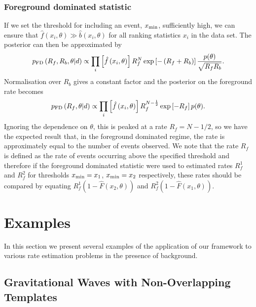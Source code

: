 \documentclass[aps,prd]{revtex4-1}
\begin{document}
\subsubsection{Foreground dominated statistic}
If we set the threshold for including an event, $x_{\rm min}$, sufficiently high, we can ensure that $\hat{f}(x_i,\theta) \gg \hat{b}(x_i,\theta)$ for all ranking statistics $x_i$ in the data set. The posterior can then be approximated by
\begin{equation}
p_{\rm FD}\left( R_f, R_b, \theta | d \right) \propto  \prod_{i} \left[ \hat{f}\left(x_i, \theta\right)\right] R_f^N \exp\left[-\left( R_f + R_b \right) \right] \frac{p(\theta)}{\sqrt{R_f R_b}}.
\end{equation}
Normalisation over $R_b$ gives a constant factor and the posterior on the foreground rate becomes
\begin{equation}
p_{\rm FD}\left( R_f, \theta | d \right) \propto  \prod_{i} \left[ \hat{f}\left(x_i, \theta\right)\right] R_f^{N-\frac{1}{2}} \exp\left[-R_f  \right] p(\theta).
\end{equation}
Ignoring the dependence on $\theta$, this is peaked at a rate $R_f = N-1/2$, so we have the expected result that, in the foreground dominated regime, the rate is approximately equal to the number of events observed. We note that the rate $R_f$ is defined as the rate of events occurring above the specified threshold and therefore if the foreground dominated statistic were used to estimated rates $R_f^1$ and $R_f^2$ for thresholds $x_{\rm min}=x_1$, $x_{\rm min}=x_2$ respectively, these rates should be compared by equating $R_f^1 (1-\hat{F}(x_2,\theta))$ and $R_f^2 (1-\hat{F}(x_1,\theta))$.


\section{Examples}
\label{sec:GW-example}

In this section we present several examples of the application of our
framework to various rate estimation problems in the presence of
background.

\subsection{Gravitational Waves with Non-Overlapping Templates}
\label{sec:analytic-GW-example}
\end{document}
